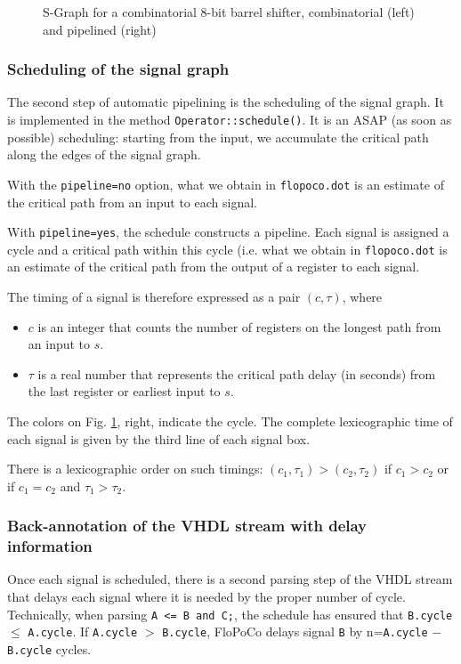 \documentclass{article}
\begin{document}
\begin{figure}
		\centering
		\caption{S-Graph for a combinatorial 8-bit barrel shifter, combinatorial (left) and pipelined (right)}
		\label{fig:depgraphShifter}
	\end{figure}    


\subsubsection{Scheduling of the signal graph}\label{sec:scheduling}
The second step of automatic pipelining is the scheduling of the signal graph.
It is implemented in the method \texttt{Operator::schedule()}.
It is an ASAP (as soon as possible) scheduling: starting from the input, we accumulate the critical path along the edges of the signal graph.

With the \texttt{pipeline=no} option, what we obtain in \texttt{flopoco.dot} is an estimate of the critical path from an input to each signal.


With \texttt{pipeline=yes}, the schedule constructs a pipeline.
Each signal is assigned a cycle and a critical path within this cycle (i.e. what we obtain in \texttt{flopoco.dot} is an estimate of the critical path from the output of a register to each signal.

The timing of a signal is therefore expressed as a pair $(c, \tau)$, where
\begin{itemize}
\item $c$ is an integer that counts the number of registers
  on the longest path from an input to $s$.
\item $\tau$ is a real number that represents the critical path delay (in seconds)
  from the last register or earliest input to $s$.
\end{itemize}

The colors on Fig. \ref{fig:depgraphShifter}, right,  indicate the cycle.
The complete lexicographic time of each signal is given by the third line of each signal box. 

There is a lexicographic order on such timings: $(c_1, \tau_1) > (c_2, \tau_2)$ if $c_1 > c_2$ or if $c_1 = c_2$ and $\tau_1 > \tau_2$.

\subsubsection{Back-annotation of the VHDL stream with delay information}
Once each signal is scheduled, there is a second parsing step of the VHDL stream that delays each signal where it is needed by the proper number of cycle.
Technically, when parsing
\verb!A <= B and C;!, the schedule has ensured that  \verb!B.cycle!$\le$ \verb!A.cycle!.
If \verb!A.cycle! $>$ \verb!B.cycle!, FloPoCo delays
signal \verb!B! by n=\verb!A.cycle! $-$ \verb!B.cycle! cycles.
\end{document}
